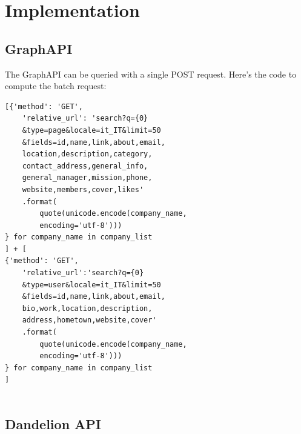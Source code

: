 \chapter{Implementation} 

\section{GraphAPI}

The GraphAPI can be queried with a single POST request.
Here's the code to compute the batch request:

\begin{verbatim}
[{'method': 'GET',
    'relative_url': 'search?q={0}
    &type=page&locale=it_IT&limit=50
    &fields=id,name,link,about,email,
    location,description,category,
    contact_address,general_info,
    general_manager,mission,phone,
    website,members,cover,likes'
    .format(
        quote(unicode.encode(company_name,
        encoding='utf-8')))
} for company_name in company_list
] + [
{'method': 'GET',
    'relative_url':'search?q={0}
    &type=user&locale=it_IT&limit=50
    &fields=id,name,link,about,email,
    bio,work,location,description,
    address,hometown,website,cover'
    .format(
        quote(unicode.encode(company_name,
        encoding='utf-8')))
} for company_name in company_list
]
        
\end{verbatim}

\section{Dandelion API}

